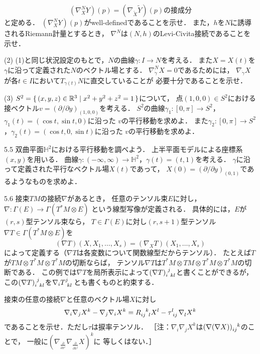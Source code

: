 \documentclass[uplatex,dvipdfmx,fontsize=12pt,jafontsize=11pt,line_length=42zw,number_of_lines=36,hanging_punctuation]{jlreq}
\begin{document}
\begin{problems}
\begin{subproblems}
\begin{equation}
					(\nabla^N_XY)(p)=\text{$(\nabla_{\tilde{X}}\tilde{Y})(p)$の接成分}
				\end{equation}
				と定める．
				$(\nabla^N_XY)(p)$がwell-definedであることを示せ．
				また，$h$を$N$に誘導されるRiemann計量とするとき，
				$\nabla^N$は$(N,h)$のLevi-Civita接続であることを示せ．
			\item[(2)]
				(1)と同じ状況設定のもとで，$N$の曲線$\gamma\colon I\to N$を考える．
				また$X=X(t)$を$\gamma$に沿って定義された$N$のベクトル場とする．
				$\nabla^N_{\dot{\gamma}}X=0$であるためには，
				$\nabla_{\dot{\gamma}}X$が各$t\in I$において$T_{\gamma(t)}N$に直交していることが
				必要十分であることを示せ．
			\item[(3)]
				$S^2=\set{(x,y,z)\in\mathbb{R}^3|x^2+y^2+z^2=1}$について，
				点$(1,0,0)\in S^2$における接ベクトル$v=(\partial/\partial y)_{(1,0,0)}$を考える．
				$S^2$の曲線$\gamma_1\colon[0,\pi]\to S^2$，$\gamma_1(t)=(\cos t,\sin t,0)$に沿った
				$v$の平行移動を求めよ．
				また$\gamma_2\colon[0,\pi]\to S^2$，$\gamma_2(t)=(\cos t,0,\sin t)$に沿った
				$v$の平行移動を求めよ．
		\end{subproblems}
	\item[5.5]
		双曲平面$\mathbb{H}^2$における平行移動を調べよう．
		上半平面モデルによる座標系$(x,y)$を用いる．
		曲線$\gamma\colon(-\infty,\infty)\to\mathbb{H}^2$，$\gamma(t)=(t,1)$を考える．
		$\gamma$に沿って定義された平行なベクトル場$X(t)$であって，
		$X(0)=(\partial/\partial y)_{(0,1)}$であるようなものを求めよ．
	\item[5.6]
		接束$TM$の接続$\nabla$があるとき，
		任意のテンソル束$E$に対し，
		$\nabla\colon\Gamma(E)\to\Gamma(T^*M\otimes E)$
		という線型写像が定義される．
		具体的には，$E$が$(r,s)$型テンソル束なら，
		$T\in\Gamma(E)$に対し$(r,s+1)$型テンソル$\nabla T\in\Gamma(T^*M\otimes E)$を
		\begin{equation}
			(\nabla T)(X,X_1,\dots,X_s)=(\nabla_X T)(X_1,\dots,X_s)
		\end{equation}
		によって定義する（$\nabla T$は各変数について関数線型だからテンソル）．
		たとえば$T$が$TM\otimes T^*M\otimes T^*M$の切断ならば，
		テンソル$\nabla T$は$T^*M\otimes TM\otimes T^*M\otimes T^*M$の切断である．
		この例では$\nabla T$を局所表示によって$\tensor{(\nabla T)}{_i^j_k_l}$と書くことができるが，
		この$\tensor{(\nabla T)}{_i^j_k_l}$を$\nabla_i\tensor{T}{^j_k_l}$とも書くものと約束する．

		接束の任意の接続$\nabla$と任意のベクトル場$X$に対し
		\begin{equation}
			\nabla_i\nabla_jX^k-\nabla_j\nabla_iX^k
			=\tensor{R}{_i_j^k_l}X^l-\tensor{\tau}{^l_i_j}\tensor{\nabla}{_l}\tensor{X}{^k}
		\end{equation}
		であることを示せ．ただし$\tau$は捩率テンソル．
		［注：$\nabla_i\nabla_jX^k$は$\tensor{(\nabla(\nabla X))}{_i_j^k}$のことで，
		一般に$(\nabla_{\frac{\partial}{\partial x^i}}\nabla_{\frac{\partial}{\partial x^j}}X)^k$に
		等しくはない．］
\end{problems}
\end{document}
